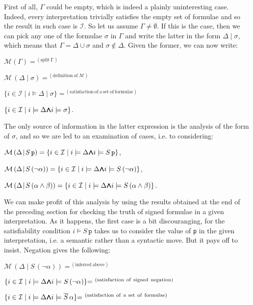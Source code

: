 \documentclass[a4paper,UKenglish]{lipics}
\newcounter{c}
\newcommand{\lett}[1]{\texttt{#1}}
\newcommand{\op}[1]{\ensuremath{\overline{#1}}}
\newcommand{\interprt}{\ensuremath{\mathcal{I}}}
\newcommand{\sat}[2]{\ensuremath{#1\models#2}}
\newcommand{\allmodels}{\ensuremath{\mathcal{M}}}
\newcommand{\iset}[1]{\ensuremath{\{i\in\interprt \mid #1\}}}
\newcommand{\ssplit}[2]{\ensuremath{#1\!\mid\!#2}}
\newcommand{\Mwedge}{\ensuremath{{\wedge\hspace{-0.65em}\wedge}\hspace{-0.65em}{\wedge\hspace{-0.65em}\wedge}}}
\begin{document}
First of all, $\Gamma$ could be empty, which is indeed a plainly uninteresting case. Indeed, every interpretation trivially satisfies the empty set of formulae and so the result in such case is \interprt. So let us assume $\Gamma\neq\emptyset$. If this is the case, then we can pick any one of the formulae $\sigma$ in $\Gamma$ and write the latter in the form \ssplit{\Delta}{\sigma}, which means that 
$\Gamma = \Delta \cup \sigma$ and 
$\sigma \not\in \Delta$. Given the former, we can now write:

$\allmodels(\Gamma)
=^{\mathrm{\ (split\ \Gamma)}}$

$\allmodels\,(\ssplit{\Delta}{\sigma})
=^{\mathrm{\ (definition\ of\ \allmodels)}}$

$\iset{\sat{i}{\ssplit{\Delta}{\sigma}}}
=^{\mathrm{\ (satisfaction\ of\ a\ set\ of\ formulae)}}$

\iset{\sat{i}{\Delta} \Mwedge \sat{i}{\sigma}}.



The only source of information in the latter expression is the analysis of the form of $\sigma$, and so we are led to an examination of cases, i.e. to considering:

$\allmodels\,(\ssplit{\Delta}{S\,\lett{p}})  = \iset{\sat{i}{\Delta} \Mwedge \sat{i}{S\,\lett{p}}}$,

$\allmodels\,(\ssplit{\Delta}{S\,(\neg\alpha)})  = \iset{\sat{i}{\Delta} \Mwedge \sat{i}{S\,(\neg\alpha)}}$,

$\allmodels\,(\ssplit{\Delta}{S\,(\alpha\wedge\beta)})  = \iset{\sat{i}{\Delta} \Mwedge \sat{i}{S\,(\alpha\wedge\beta)}}$.

\noindent We can make profit of this analysis by using the results obtained at the end of the preceding section for checking the truth of signed formulae in a given interpretation.
As it happens, the first case is a bit discouranging, for the satisfiability condition \sat{i}{S\,\lett{p}} takes us to consider the value of \lett{p} in the given interpretation, i.e. a semantic rather than a syntactic move. But it pays off to insist. Negation gives the following:




$\allmodels\,(\ssplit{\Delta}{S\,(\neg\alpha)})
{=}^{\mathrm{\ (inferred\ above)}}$

$\iset{\sat{i}{\Delta} \Mwedge \sat{i}{S\,(\neg\alpha)}}
{=}^{\mathrm{\ (satisfaction\ of\ signed\ negation)}}$

$\iset{\sat{i}{\Delta} \Mwedge \sat{i}{\op{S}\,\alpha}}
{=}^{\mathrm{\ (satisfaction\ of\ a\ set\ of\ formulae)}}$
\end{document}
